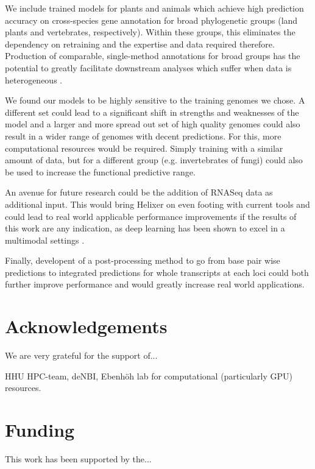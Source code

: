 \documentclass{bioinfo}
\begin{document}
We include trained models for plants and animals which achieve 
high prediction accuracy on cross-species gene annotation for broad 
phylogenetic groups (land plants and vertebrates, respectively).
Within these groups, this eliminates the dependency on retraining and the
expertise and data required therefore. Production of comparable, single-method
annotations for broad groups has the potential to greatly facilitate downstream
analyses which suffer when data is heterogeneous \citep{}.

We found our models to be highly sensitive to the training genomes we chose. A 
different set could lead to a significant shift in strengths and weaknesses of the 
model and a larger and more spread out set of high quality genomes could also result 
in a wider range of genomes with decent predictions. For this, more computational 
resources would be required. Simply training with a similar amount of data, 
but for a different group (e.g. invertebrates of fungi) could also be used to 
increase the functional predictive range. 

An avenue for future research could be the addition of RNASeq data as additional 
input. This would bring Helixer on even footing with current tools and could lead 
to real world applicable performance improvements if the results of this work are 
any indication, as deep learning has been shown to excel in a multimodal settings 
\citep{ching2018opportunities}.

Finally, developent of a post-processing method
to go from base pair wise predictions to integrated predictions for whole 
transcripts at each loci could both further improve performance and would
greatly increase real world applications.
\FloatBarrier

\section*{Acknowledgements}

We are very grateful for the support of...

HHU HPC-team, deNBI, Ebenh{\"o}h lab for computational (particularly GPU) resources.

\section*{Funding}

This work has been supported by the... \vspace*{-12pt}
\end{document}
